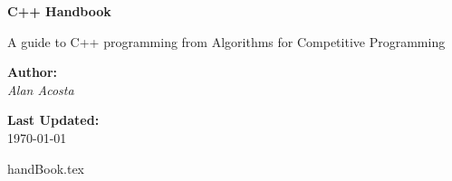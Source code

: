 \documentclass[11pt, titlepage]{article}
\begin{document}
    \begin{titlepage}
        \begin{center}
            \vspace*{1cm}
            \Huge
            \textbf{C++ Handbook}
            
            \vspace{0.5cm}
            \LARGE
            A guide to C++ programming from Algorithms for Competitive Programming
            
            \vspace{1.5cm}
            \textbf{Author:} \\
            \Large
            \textit{Alan Acosta}
            
            \vfill
            \Large
            \textbf{Last Updated:} \\
            \today
        \end{center}
    \end{titlepage}

    \tableofcontents

    \newpage

    {handBook.tex}
\end{document}
